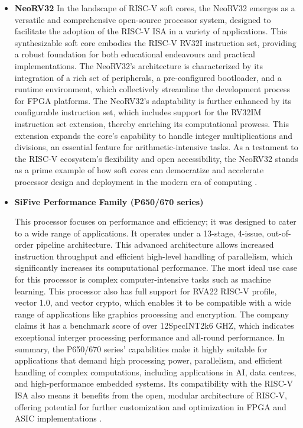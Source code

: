 \documentclass[conference]{IEEEtran}
\begin{document}
\begin{itemize}
\item\textbf{NeoRV32}
In the landscape of RISC-V soft cores, the NeoRV32 emerges as a versatile and comprehensive open-source processor system, designed to facilitate the adoption of the RISC-V ISA in a variety of applications. This synthesizable soft core embodies the RISC-V RV32I instruction set, providing a robust foundation for both educational endeavours and practical implementations. The NeoRV32's architecture is characterized by its integration of a rich set of peripherals, a pre-configured bootloader, and a runtime environment, which collectively streamline the development process for FPGA platforms. The NeoRV32's adaptability is further enhanced by its configurable instruction set, which includes support for the RV32IM instruction set extension, thereby enriching its computational prowess. This extension expands the core's capability to handle integer multiplications and divisions, an essential feature for arithmetic-intensive tasks. As a testament to the RISC-V ecosystem's flexibility and open accessibility, the NeoRV32 stands as a prime example of how soft cores can democratize and accelerate processor design and deployment in the modern era of computing \cite{10}.






    \item \textbf{SiFive Performance Family (P650/670 series)}
    
This processor focuses on performance and efficiency; it was designed to cater to a wide range of applications. It operates under a 13-stage, 4-issue, out-of-order pipeline architecture. This advanced architecture allows increased instruction throughput and efficient high-level handling of parallelism, which significantly increases its computational performance. The most ideal use case for this processor is complex computer-intensive tasks such as machine learning. This processor also has full support for RVA22 RISC-V profile, vector 1.0, and vector crypto, which enables it to be compatible with a wide range of applications like graphics processing and encryption. The company claims it has a benchmark score of over 12SpecINT2k6 GHZ, which indicates exceptional interger processing performance and all-round performance.
In summary, the P650/670 series' capabilities make it highly suitable for applications that demand high processing power, parallelism, and efficient handling of complex computations, including applications in AI, data centres, and high-performance embedded systems. Its compatibility with the RISC-V ISA also means it benefits from the open, modular architecture of RISC-V, offering potential for further customization and optimization in FPGA and ASIC implementations \cite{12}.



\end{itemize}
\end{document}
